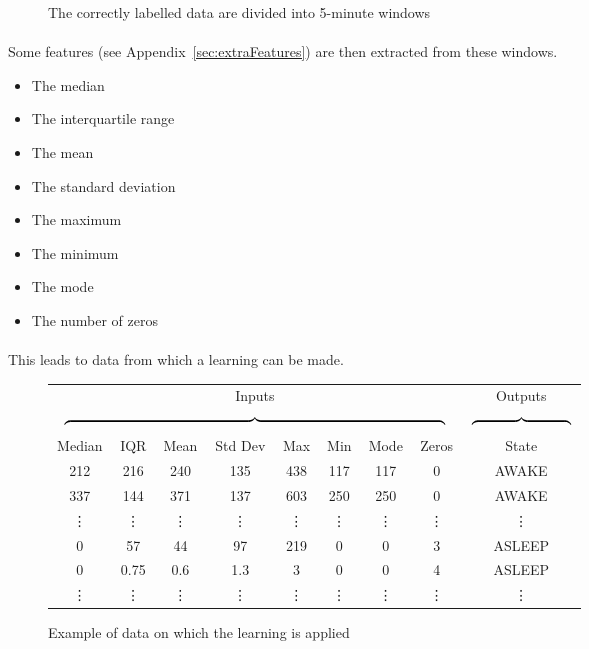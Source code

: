 \documentclass[a4paper,12pt]{article}
\begin{document}
\begin{figure}[H]
{}
\caption{The correctly labelled data are divided into 5-minute windows}
\label{5min}
\end{figure}

\paragraph{}
Some features (see Appendix~\ref{sec:extraFeatures}) are then extracted from these windows.

\begin{itemize}
\item The median
\item The interquartile range
\item The mean
\item The standard deviation
\item The maximum
\item The minimum
\item The mode
\item The number of zeros
\end{itemize}

\paragraph{}
This leads to data from which a learning can be made.

\begin{figure}[H]
\centering
\begin{tabular}{cccccccc|c}
\multicolumn{8}{c}{Inputs} & Outputs \\
\multicolumn{8}{c}{$\overbrace{\rule{10cm}{0pt}}$} &  $\overbrace{\rule{2.6cm}{0pt}}$ \\
Median & IQR & Mean & Std Dev & Max & Min & Mode & Zeros & State \\
\hline
212 & 216 & 240 & 135 & 438 & 117 & 117 & 0 & AWAKE \\
337 & 144 & 371 & 137 & 603 & 250 & 250 & 0 & AWAKE \\
\vdots & \vdots & \vdots & \vdots & \vdots & \vdots & \vdots & \vdots & \vdots \\ 
0 & 57 & 44 & 97 & 219 & 0 & 0 & 3 & ASLEEP \\
0 & 0.75 & 0.6 & 1.3 & 3 & 0 & 0 & 4 & ASLEEP \\
\vdots & \vdots & \vdots & \vdots & \vdots & \vdots & \vdots & \vdots & \vdots \\
\end{tabular}
\caption{Example of data on which the learning is applied}
\end{figure}
\end{document}
